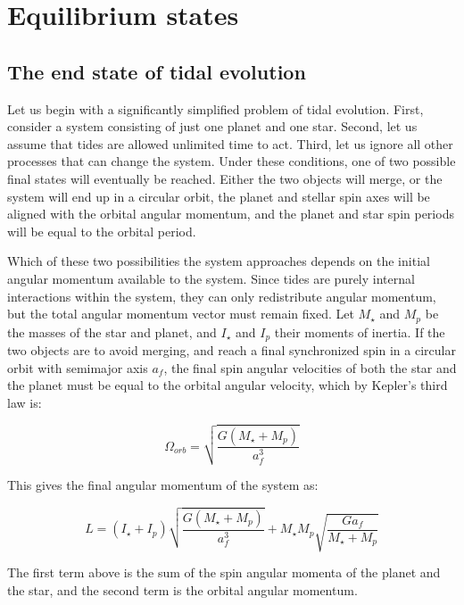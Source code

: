 \section{Equilibrium states}
%
\label{sec:equilibrium}

\subsection{The end state of tidal evolution}

Let us begin with a significantly simplified problem of tidal evolution. First,
consider a system consisting of just one planet and one star. Second, let us
assume that tides are allowed unlimited time to act. Third, let us ignore all
other processes that can change the system. Under these conditions, one of two
possible final states will eventually be reached. Either the two objects will
merge, or the system will end up in a circular orbit, the planet and stellar
spin axes will be aligned with the orbital angular momentum, and the planet and
star spin periods will be equal to the orbital period.

Which of these two possibilities the system approaches depends on the initial
angular momentum available to the system. Since tides are purely internal
interactions within the system, they can only redistribute angular momentum, but
the total angular momentum vector must remain fixed. Let $M_\star$ and $M_p$ be
the masses of the star and planet, and $I_\star$ and $I_p$ their moments of
inertia.  If the two objects are to avoid merging, and reach a final
synchronized spin in a circular orbit with semimajor axis $a_f$, the final spin
angular velocities of both the star and the planet must be equal to the orbital
angular velocity, which by Kepler's third law is:

\begin{equation}
%
    \Omega_{orb} = \sqrt{\frac{G (M_\star + M_p)}{a_f^3}}
%
    \label{eq:orbital_angular_velocity}
%
\end{equation}

This gives the final angular momentum of the system as:

\begin{equation}
%
    L
%
    =
%
    \left(I_\star + I_p\right) \sqrt{\frac{G (M_\star + M_p)}{a_f^3}}
%
    +
%
    M_\star M_p \sqrt{\frac{G a_f}{M_\star + M_p}}
%
    \label{eq:equilibrium_angmom}
%
\end{equation}

The first term above is the sum of the spin angular momenta of the planet and
the star, and the second term is the orbital angular momentum.

